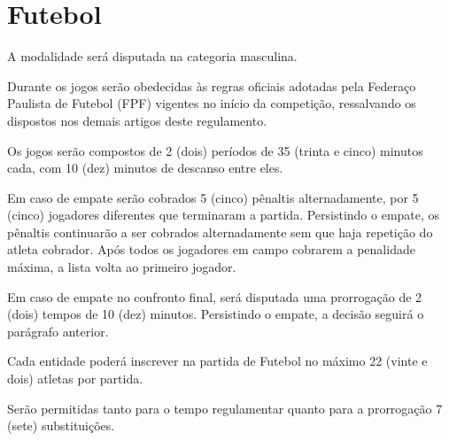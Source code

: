 {\let\clearpage\relax \chapter{Futebol}}

\begin{article}
	A modalidade será disputada na categoria masculina.
\end{article}

\begin{article}
	Durante os jogos serão obedecidas às regras oficiais adotadas pela Federaço Paulista de Futebol (FPF) vigentes no início da competição, ressalvando os dispostos nos demais artigos deste regulamento.
\end{article}

\begin{article}
	Os jogos serão compostos de 2 (dois) períodos de 35 (trinta e cinco) minutos cada, com 10 (dez) minutos de descanso entre eles.

	\begin{xparagraph}
		Em caso de empate serão cobrados 5 (cinco) pênaltis alternadamente, por 5 (cinco) jogadores diferentes que terminaram a partida. Persistindo o empate, os pênaltis continuarão a ser cobrados alternadamente sem que haja repetição do atleta cobrador. Após todos os jogadores em campo cobrarem a penalidade máxima, a lista volta ao primeiro jogador.
	\end{xparagraph}

	\begin{xparagraph}
		Em caso de empate no confronto final, será disputada uma prorrogação de 2 (dois) tempos de 10 (dez) minutos. Persistindo o empate, a decisão seguirá o parágrafo anterior.
	\end{xparagraph}
\end{article}

\begin{article}
	Cada entidade poderá inscrever na partida de Futebol no máximo 22 (vinte e dois) atletas por partida.
\end{article}

\begin{article}
	Serão permitidas tanto para o tempo regulamentar quanto para a prorrogação 7 (sete) substituições.
\end{article}
